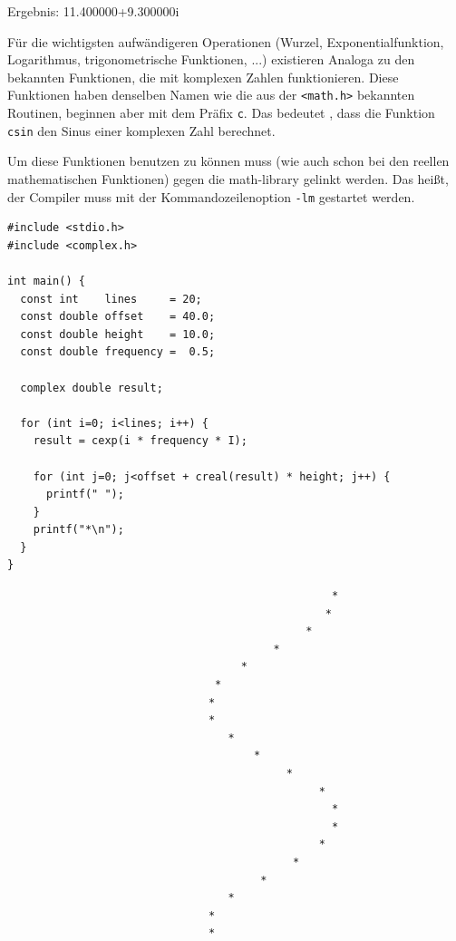 \begin{cmdbox}
Ergebnis: 11.400000+9.300000i
\end{cmdbox}

Für die wichtigsten aufwändigeren Operationen (Wurzel, Exponentialfunktion, Logarithmus, trigonometrische Funktionen, ...) existieren Analoga zu den bekannten Funktionen, die mit komplexen Zahlen funktionieren. Diese Funktionen haben denselben Namen wie die aus der \texttt{<math.h>} bekannten Routinen, beginnen aber mit dem Präfix \texttt{c}. Das bedeutet \eg, dass die Funktion \texttt{csin} den Sinus einer komplexen Zahl berechnet.

Um diese Funktionen benutzen zu können muss (wie auch schon bei den reellen mathematischen Funktionen) gegen die math-library gelinkt werden. Das heißt, der Compiler muss mit der Kommandozeilenoption \texttt{-lm} gestartet werden.

\begin{codebox}
\begin{verbatim}
#include <stdio.h>
#include <complex.h>
 
int main() {
  const int    lines     = 20;
  const double offset    = 40.0;
  const double height    = 10.0;
  const double frequency =  0.5;
  
  complex double result;
  
  for (int i=0; i<lines; i++) {
    result = cexp(i * frequency * I);
    
    for (int j=0; j<offset + creal(result) * height; j++) {
      printf(" ");
    }
    printf("*\n");
  }
}
\end{verbatim}
\end{codebox}

\begin{cmdbox}
\begin{verbatim}
                                                  *
                                                 *
                                              *
                                         *
                                    *
                                *
                               *
                               *
                                  *
                                      *
                                           *
                                                *
                                                  *
                                                  *
                                                *
                                            *
                                       *
                                  *
                               *
                               *
\end{verbatim}
\end{cmdbox}

